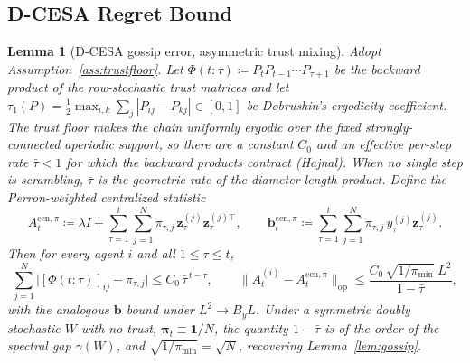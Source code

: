 \documentclass[11pt]{article}
\newtheorem{lemma}[theorem]{Lemma}
\begin{document}
\subsection{D-CESA Regret Bound}\label{sec:dcesa_regret}

\begin{lemma}[D-CESA gossip error, asymmetric trust mixing]\label{lem:gossip_dcesa}
Adopt Assumption~\ref{ass:trustfloor}.  Let
$\Phi(t{:}\tau)\coloneqq P_t P_{t-1}\cdots P_{\tau+1}$ be the backward
product of the row-stochastic trust matrices and let
$\tau_1(P)=\tfrac12\max_{i,k}\sum_j|P_{ij}-P_{kj}|\in[0,1]$ be
Dobrushin's ergodicity coefficient.  The trust floor makes the chain
uniformly ergodic over the fixed strongly-connected aperiodic support, so
there are a constant $C_0$ and an effective per-step rate
$\bar\tau<1$ for which the backward products contract (Hajnal).  When no
single step is scrambling, $\bar\tau$ is the geometric rate of the
diameter-length product.  Define the Perron-weighted centralized
statistic
\[
A_t^{\mathrm{cen},\pi}\coloneqq\lambda I+\sum_{\tau=1}^t\sum_{j=1}^N
\pi_{\tau,j}\,\bm{z}_\tau^{(j)}\bm{z}_\tau^{(j)\top},
\qquad
\bm{b}_t^{\mathrm{cen},\pi}\coloneqq\sum_{\tau=1}^t\sum_{j=1}^N
\pi_{\tau,j}\,y_\tau^{(j)}\bm{z}_\tau^{(j)} .
\]
Then for every agent $i$ and all $1\leq\tau\leq t$,
\[
\sum_{j=1}^N\bigl|[\Phi(t{:}\tau)]_{ij}-\pi_{\tau,j}\bigr|
\leq C_0\,\bar\tau^{\,t-\tau},
\qquad
\|A_t^{(i)}-A_t^{\mathrm{cen},\pi}\|_{\mathrm{op}}
\leq\frac{C_0\,\sqrt{1/\pi_{\min}}\;L^2}{1-\bar\tau},
\]
with the analogous $\bm{b}$ bound under $L^2\to B_y L$.  Under a symmetric
doubly stochastic $W$ with no trust, $\bm{\pi}_t\equiv\mathbf 1/N$,
the quantity $1-\bar\tau$ is of the order of the spectral gap
$\gamma(W)$, and $\sqrt{1/\pi_{\min}}=\sqrt N$, recovering
Lemma~\ref{lem:gossip}.
\end{lemma}
\end{document}
